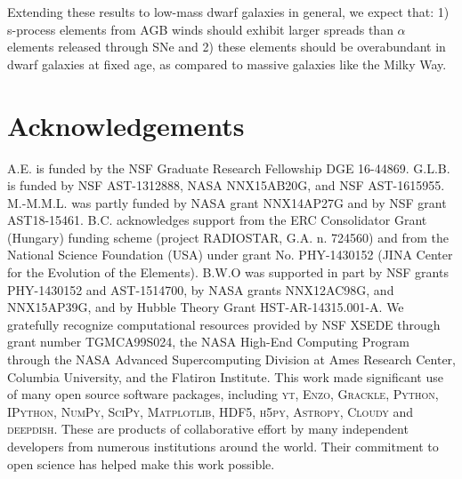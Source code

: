    Extending these results to low-mass dwarf galaxies in general, we expect that: 1) s-process elements from AGB winds should exhibit larger spreads than $\alpha$ elements released through SNe and 2) these elements should be overabundant in dwarf galaxies at fixed age, as compared to massive galaxies like the Milky Way.

\section*{Acknowledgements}
A.E. is funded by the NSF Graduate Research Fellowship DGE 16-44869. G.L.B. is funded by NSF AST-1312888, NASA NNX15AB20G, and NSF AST-1615955. M.-M.M.L. was partly funded by NASA  grant NNX14AP27G and by NSF grant AST18-15461. B.C. acknowledges support from the ERC Consolidator Grant (Hungary) funding scheme (project RADIOSTAR, G.A. n. 724560) and from the National Science Foundation (USA) under grant No. PHY-1430152 (JINA Center for the Evolution of the Elements). B.W.O was supported in part by NSF grants PHY-1430152 and AST-1514700, by NASA grants NNX12AC98G, and NNX15AP39G, and by Hubble Theory Grant HST-AR-14315.001-A. We gratefully recognize computational resources provided by NSF XSEDE through grant number TGMCA99S024, the NASA High-End Computing Program through the NASA Advanced Supercomputing Division at Ames Research Center, Columbia University, and the Flatiron Institute. This work made significant use of many open source software packages, including \textsc{yt}, \textsc{Enzo}, \textsc{Grackle}, \textsc{Python}, \textsc{IPython}, \textsc{NumPy}, \textsc{SciPy}, \textsc{Matplotlib}, \textsc{HDF5}, \textsc{h5py}, \textsc{Astropy}, \textsc{Cloudy} and \textsc{deepdish}. These are products of collaborative effort by many independent developers from numerous institutions around the world. Their commitment to open science has helped make this work possible. 

